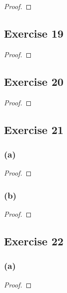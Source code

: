 \documentclass[14pt]{extarticle}
\begin{document}
\begin{proof}

\end{proof}

\subsection{Exercise 19}

\begin{proof}

\end{proof}

\subsection{Exercise 20}

\begin{proof}

\end{proof}

\subsection{Exercise 21}

\subsubsection{(a)}

\begin{proof}

\end{proof}

\subsubsection{(b)}

\begin{proof}

\end{proof}

\subsection{Exercise 22}

\subsubsection{(a)}

\begin{proof}

\end{proof}
\end{document}
